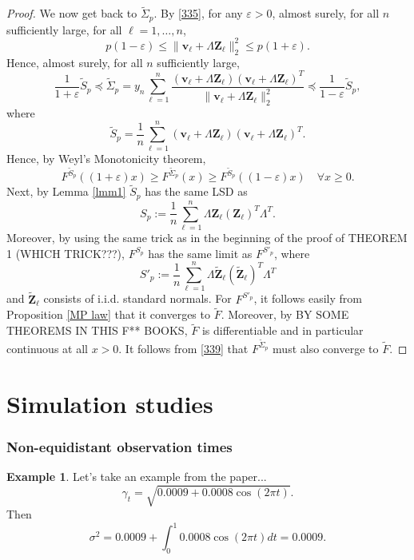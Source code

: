 \documentclass[a4paper,11pt]{article}
\theoremstyle{plain}
\theoremstyle{definition}
\newtheorem{exmp}[thm]{Example}
\begin{document}
\begin{proof}
    	 We now get back to $\widetilde{\Sigma}_p$. By \eqref{335}, for any $\varepsilon > 0$, almost surely, for all $n$ sufficiently large, for all $\ell = 1, \dots, n$,
    	 \[ p(1-\varepsilon) \leq \| \mathbf{v}_\ell + \Lambda \mathbf{Z}_\ell \|_2^2 \leq p(1+\varepsilon). \]
    	 Hence, almost surely, for all $n$ sufficiently large,
    	 \[ \frac{1}{1+\varepsilon} \widetilde{S}_p \preceq \widetilde{\Sigma}_p = y_n \sum_{\ell=1}^{n} \frac{(\mathbf{v}_\ell + \Lambda \mathbf{Z}_\ell) (\mathbf{v}_\ell + \Lambda \mathbf{Z}_\ell)^T}{\|\mathbf{v}_\ell + \Lambda \mathbf{Z}_\ell\|_2^2} \preceq \frac{1}{1-\varepsilon} \widetilde{S}_p, \]
    	 where
    	 \[  \widetilde{S}_p = \frac{1}{n}\sum_{\ell=1}^{n} (\mathbf{v}_\ell + \Lambda \mathbf{Z}_\ell) (\mathbf{v}_\ell + \Lambda \mathbf{Z}_\ell)^T. \]
    	 Hence, by Weyl's Monotonicity theorem,
    	 \begin{equation} \label{339}
    	     F^{\widetilde{S}_p}((1+\varepsilon)x) \geq F^{\widetilde{\Sigma}_p}(x) \geq F^{\widetilde{S}_p}((1-\varepsilon)x) \quad \forall x \geq 0.
    	 \end{equation}
    	 Next, by Lemma \ref{lmm1} $\widetilde{S}_p$ has the same LSD as 
    	 \[S_p := \frac{1}{n} \sum_{\ell=1}^{n} \Lambda \mathbf{Z}_\ell (\mathbf{Z}_\ell)^T \Lambda^T.\]
    	 Moreover, by using the same trick as in the beginning of the proof of THEOREM 1 (WHICH TRICK???), $F^{S_p}$ has the same limit as $F^{S'_p}$, where
    	 \[S'_p := \frac{1}{n} \sum_{\ell=1}^{n} \Lambda \widetilde{\mathbf{Z}}_\ell (\widetilde{\mathbf{Z}}_\ell)^T \Lambda^T\]
    	 and $\widetilde{\mathbf{Z}}_\ell$ consists of i.i.d. standard normals. For $F^{S'_p}$, it follows easily from Proposition \ref{MP law} that it converges to $\widetilde{F}$. Moreover, by BY SOME THEOREMS IN THIS F** BOOKS, $\widetilde{F}$ is differentiable and in particular continuous at all $x > 0$. It follows from \eqref{339} that $F^{\widetilde{\Sigma}_p}$ must also converge to $\widetilde{F}$.
    \end{proof}
    
    \pagebreak
    \part{Simulation studies}
    \section*{Non-equidistant observation times}
    \begin{exmp} \label{SimCos}
    	Let's take an example from the paper...
    	\[
    		\gamma_t = \sqrt{0.0009 + 0.0008 \cos(2 \pi t)}.
    	\]
    	Then
    	\[ \sigma^2 = 0.0009 + \int_{0}^{1}0.0008 \cos(2 \pi t) dt = 0.0009. \]
    \end{exmp}
    
\end{document}
